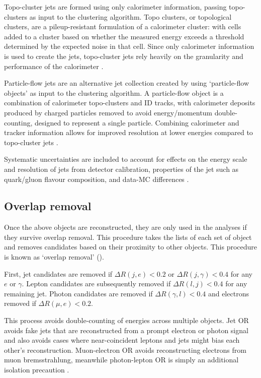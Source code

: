 Topo-cluster jets are formed using only calorimeter information, passing
topo-clusters as input to the clustering algorithm. Topo clusters, or
topological clusters, are a pileup-resistant formulation of a calorimeter
cluster: with cells added to a cluster based on whether the measured energy
exceeds a threshold determined by the expected noise in that cell. Since only
calorimeter information is used to create the jets, topo-cluster jets rely
heavily on the granularity and performance of the calorimeter \cite{Aad2017b}.

Particle-flow jets are an alternative jet collection created by using
`particle-flow objects' as input to the clustering algorithm. A particle-flow
object is a combination of calorimeter topo-clusters and \ac{ID} tracks, with
calorimeter deposits produced by charged particles removed to avoid
energy/momentum double-counting, designed to represent a single particle.
Combining calorimeter and tracker information allows for improved resolution at
lower energies compared to topo-cluster jets \cite{Aaboud2017a}.

Systematic uncertainties are included to account for effects on the energy scale
and resolution of jets from detector calibration, properties of the jet such as
quark/gluon flavour composition, and data-\ac{MC} differences
\cite{JESUncerts2017}.

\subsection{Overlap removal}

Once the above objects are reconstructed, they are only used in the analyses if
they survive overlap removal. This procedure takes the lists of each set of
object and removes candidates based on their proximity to other objects. This
procedure is known as `overlap removal' ().

First, jet candidates are removed if $\Delta R(j,e) < 0.2$ or $\Delta
R(j,\gamma) < 0.4$ for any $e$ or $\gamma$. Lepton candidates are subsequently
removed if $\Delta R(l,j) < 0.4$ for any remaining jet. Photon candidates are
removed if $\Delta R(\gamma,l) < 0.4$ and electrons removed if $\Delta R(\mu,e)
< 0.2$.

\begin{sloppypar}
This process avoids double-counting of energies across multiple objects.  Jet
\ac{OR} avoids fake jets that are reconstructed from a prompt electron or photon
signal and also avoids cases where near-coincident leptons and jets might bias
each other's reconstruction. Muon-electron \ac{OR} avoids reconstructing
electrons from muon bremsstrahlung, meanwhile photon-lepton \ac{OR} is simply an
additional isolation precaution \cite{Adams2015}.
\end{sloppypar}
